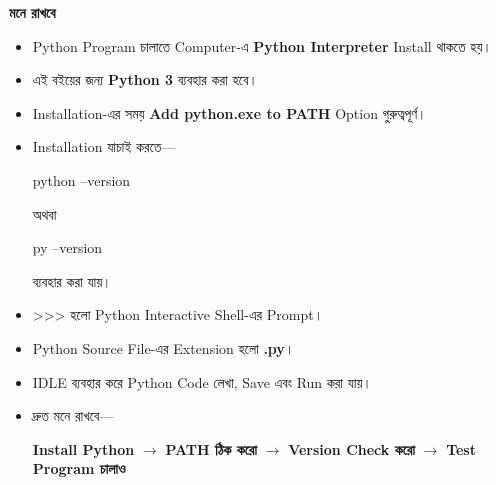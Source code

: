 \begin{rememberbox}

\textbf{\color{deepOrange}মনে রাখবে}

\begin{itemize}

\item
Python Program চালাতে Computer-এ
\textbf{Python Interpreter}
Install থাকতে হয়।

\item
এই বইয়ের জন্য
\textbf{Python 3}
ব্যবহার করা হবে।

\item
Installation-এর সময়
\textbf{Add python.exe to PATH}
Option গুরুত্বপূর্ণ।

\item
Installation যাচাই করতে—

\begin{center}

\textenglish{\ttfamily python --version}

অথবা

\textenglish{\ttfamily py --version}

\end{center}

ব্যবহার করা যায়।

\item
\textenglish{\ttfamily >>>}
হলো Python Interactive Shell-এর Prompt।

\item
Python Source File-এর Extension হলো
\textbf{\textenglish{\ttfamily .py}}।

\item
IDLE ব্যবহার করে Python Code লেখা, Save এবং Run করা যায়।

\item
দ্রুত মনে রাখবে—

\begin{center}

\textbf{Install Python}
\(\longrightarrow\)
\textbf{PATH ঠিক করো}
\(\longrightarrow\)
\textbf{Version Check করো}
\(\longrightarrow\)
\textbf{Test Program চালাও}

\end{center}

\end{itemize}

\end{rememberbox}

\small


